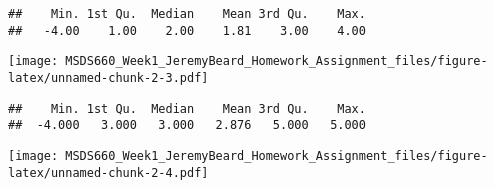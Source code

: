 \documentclass[
]{article}
\newenvironment{Shaded}{\begin{snugshade}}{\end{snugshade}}
\newcommand{\AlertTok}[1]{\textcolor[rgb]{0.94,0.16,0.16}{#1}}
\newcommand{\CommentTok}[1]{\textcolor[rgb]{0.56,0.35,0.01}{\textit{#1}}}
\newcommand{\FunctionTok}[1]{\textcolor[rgb]{0.00,0.00,0.00}{#1}}
\newcommand{\NormalTok}[1]{#1}
\newcommand{\SpecialCharTok}[1]{\textcolor[rgb]{0.00,0.00,0.00}{#1}}
\begin{document}
\begin{Shaded}
\end{Shaded}

\begin{verbatim}
##    Min. 1st Qu.  Median    Mean 3rd Qu.    Max. 
##   -4.00    1.00    2.00    1.81    3.00    4.00
\end{verbatim}

\begin{Shaded}
\end{Shaded}

\texttt{[image: MSDS660\_Week1\_JeremyBeard\_Homework\_Assignment\_files/figure-latex/unnamed-chunk-2-3.pdf]}

\begin{Shaded}
\end{Shaded}

\begin{verbatim}
##    Min. 1st Qu.  Median    Mean 3rd Qu.    Max. 
##  -4.000   3.000   3.000   2.876   5.000   5.000
\end{verbatim}

\begin{Shaded}
\end{Shaded}

\texttt{[image: MSDS660\_Week1\_JeremyBeard\_Homework\_Assignment\_files/figure-latex/unnamed-chunk-2-4.pdf]}

\begin{Shaded}
\end{Shaded}
\end{document}
